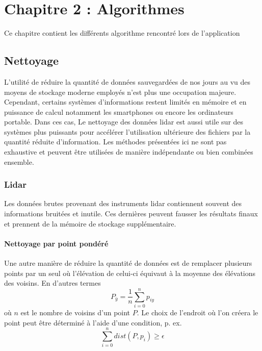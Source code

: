 \chapter{Chapitre 2 : Algorithmes}

Ce chapitre contient les différents algorithme rencontré lors de l'application 

\section{Nettoyage}

L'utilité de réduire la quantité de données sauvegardées de nos jours au vu des 
moyens de stockage moderne employés n'est plus une occupation majeure.
Cependant, certains systèmes d'informations restent limités en mémoire et en
puissance de calcul notamment les smartphones ou encore les ordinateurs portable.
Dans ces cas, 
Le nettoyage des données \gls{lidar} est aussi utile sur des systèmes plus puissants
pour accélérer l'utilisation ultérieure des fichiers par la quantité réduite
d'information.
Les méthodes présentées ici ne sont pas exhaustive et peuvent être utilisées
de manière indépendante ou bien combinées ensemble.

\subsection{Lidar}

Les données brutes provenant des instruments \gls{lidar} contiennent souvent
des informations bruitées et inutile. Ces dernières peuvent fausser les résultats
finaux et prennent de la mémoire de stockage supplémentaire.

\subsubsection{Nettoyage par point pondéré}

Une autre manière de réduire la quantité de données est de remplacer plusieurs points par un seul où l'élévation de celui-ci équivaut à la moyenne des élévations des voisins.
En d'autres termes $$ P_{\bar{y}} = \frac{1}{n} \sum_{i=0}^{n} p_{iy} $$
où $n$ est le nombre de voisins d'un point $P$. 
Le choix de l'endroit où l'on créera le point peut être déterminé à l'aide d'une condition, p. ex. $$\sum_{i=0}^n dist(P, p_i) \geq \epsilon$$

